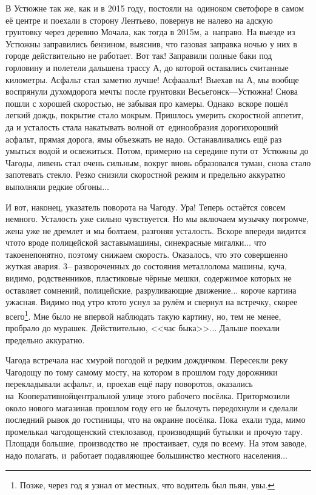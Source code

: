 В Устюжне так же, как и в 2015 году, постояли на~одиноком светофоре в самом её центре и поехали в сторону Лентьево, повернув не налево на адскую грунтовку через деревню Мочала, как тогда в 2015\sdash м, а~направо. На выезде из Устюжны заправились бензином, выяснив, что газовая заправка ночью у них в городе действительно не работает. Вот так! Заправили полные баки под горловину и полетели дальше\mdash на трассу А, до которой оставались считанные километры. Асфальт стал заметно лучше! Асфа\sdash а\sdash альт! Выехав на А, мы вообще воспрянули духом\mdash дорога мечты после грунтовки Весьегонск\thinspace\nobreakdash---\thinspace Устюжна! Снова пошли с хорошей скоростью, не забывая про камеры. Однако~вскоре пошёл легкий дождь, покрытие стало мокрым. Пришлось умерить скоростной аппетит, да и усталость стала накатывать волной от~единообразия дороги\mdash хороший асфальт, прямая дорога, ямы объезжать не надо. Останавливались ещё раз умыться водой и освежиться. Потом, примерно на середине пути от~Устюжны до Чагоды, ливень стал очень сильным, вокруг вновь образовался туман, снова стало запотевать стекло. Резко снизили скоростной режим и предельно аккуратно выполняли редкие обгоны$\ldots$

\renewcommand*{\thefootnote}{\fnsymbol{footnote}}
И вот, наконец, указатель поворота на Чагоду. Ура! Теперь остаётся совсем немного. Усталость уже сильно чувствуется. Но мы включаем музычку погромче, жена уже не дремлет и мы болтаем, разгоняя усталость. Вскоре впереди видится что\sdash то вроде полицейской заставы\mdash машины, сине\sdash красные мигалки$\ldots$ что такое\mdash непонятно, поэтому снижаем скорость. Оказалось, что это совершенно жуткая авария. 3\thinspace\nobreakdash-- развороченных до состояния металлолома машины, куча, видимо, родственников, пластиковые чёрные мешки, содержимое которых не оставляет сомнений, полицейские, разруливающие движение$\ldots$ короче картина ужасная. Видимо под утро кто\sdash то уснул за рулём и свернул на встречку, скорее всего\footnote[1]{Позже, через год я узнал от местных, что водитель был пьян, увы.}. Мне было не впервой наблюдать такую картину, но, тем не менее, пробрало до мурашек. Действительно, <<час быка>>$\ldots$ Дальше поехали предельно аккуратно.

Чагода встречала нас хмурой погодой и редким дождичком. Пересекли реку Чагодощу по тому самому мосту, на котором в прошлом году дорожники перекладывали асфальт, и, проехав ещё пару поворотов, оказались на~Кооперативной\mdash центральной улице этого рабочего посёлка. Притормозили около нового магазина\mdash в прошлом году его не было\mdash чуть передохнули и сделали последний рывок до гостиницы, что на окраине посёлка. Пока~ехали туда, мимо промелькал чагодощенский стеклозавод, производящий бутылки и прочую тару. Площади большие, производство не~простаивает, судя по всему. На этом заводе, надо полагать, и~работает подавляющее большинство местного населения$\ldots$

